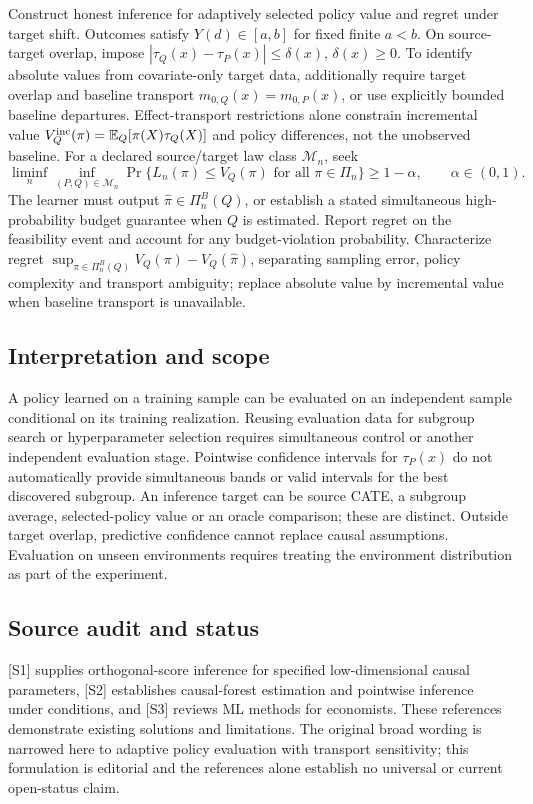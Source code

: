 \documentclass[11pt,a4paper]{article}
\begin{document}
Construct honest inference for adaptively selected policy value and regret under target shift. Outcomes satisfy $Y(d)\in[a,b]$ for fixed finite $a<b$. On source-target overlap, impose $|\tau_Q(x)-\tau_P(x)|\le\delta(x)$, $\delta(x)\ge0$. To identify absolute values from covariate-only target data, additionally require target overlap and baseline transport $m_{0,Q}(x)=m_{0,P}(x)$, or use explicitly bounded baseline departures. Effect-transport restrictions alone constrain incremental value $V_Q^{\rm inc}(\pi)=\mathbb E_Q[\pi(X)\tau_Q(X)]$ and policy differences, not the unobserved baseline. For a declared source/target law class $\mathcal M_n$, seek
\[
\liminf_n\inf_{(P,Q)\in\mathcal M_n}
\Pr\{L_n(\pi)\le V_Q(\pi)\text{ for all }\pi\in\Pi_n\}
\ge1-\alpha,\qquad\alpha\in(0,1).
\]
The learner must output $\widehat\pi\in\Pi_n^B(Q)$, or establish a stated simultaneous high-probability budget guarantee when $Q$ is estimated. Report regret on the feasibility event and account for any budget-violation probability. Characterize regret $\sup_{\pi\in\Pi_n^B(Q)}V_Q(\pi)-V_Q(\widehat\pi)$, separating sampling error, policy complexity and transport ambiguity; replace absolute value by incremental value when baseline transport is unavailable.

\subsection*{Interpretation and scope}

A policy learned on a training sample can be evaluated on an independent sample conditional on its training realization. Reusing evaluation data for subgroup search or hyperparameter selection requires simultaneous control or another independent evaluation stage. Pointwise confidence intervals for $\tau_P(x)$ do not automatically provide simultaneous bands or valid intervals for the best discovered subgroup. An inference target can be source CATE, a subgroup average, selected-policy value or an oracle comparison; these are distinct. Outside target overlap, predictive confidence cannot replace causal assumptions. Evaluation on unseen environments requires treating the environment distribution as part of the experiment.

\subsection*{Source audit and status}

[S1] supplies orthogonal-score inference for specified low-dimensional causal parameters, [S2] establishes causal-forest estimation and pointwise inference under conditions, and [S3] reviews ML methods for economists. These references demonstrate existing solutions and limitations. The original broad wording is narrowed here to adaptive policy evaluation with transport sensitivity; this formulation is editorial and the references alone establish no universal or current open-status claim.
\end{document}
